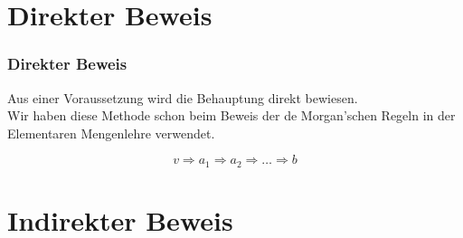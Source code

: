 \documentclass[
				hyperref={pdftex,
						breaklinks,
						pdfauthor={Andreas Weber},
						pdftitle={Logik und Algebra},
						colorlinks=true,
						urlcolor=blue,
						linkcolor=		%
				},
				xcolor=dvipsnames
			]
			{beamer}
\begin{document}
\section{Direkter Beweis}
%
\begin{frame}\frametitle{Direkter Beweis}
	
	Aus einer Voraussetzung wird die Behauptung direkt bewiesen. \\[1mm]
	Wir haben diese Methode schon beim Beweis der de Morgan'schen Regeln in der Elementaren Mengenlehre verwendet.
	
	
	$$
		v \Rightarrow a_1 \Rightarrow a_2 \Rightarrow\ldots\Rightarrow b
	$$
	
\end{frame}
%
\section{Indirekter Beweis}
%
\end{document}
